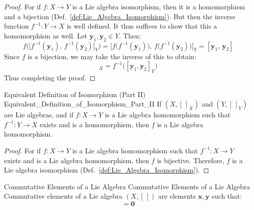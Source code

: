 \documentclass[crop=false,class=article]{standalone}                           %
\begin{document}
        \begin{proof}
            For if $f:X\rightarrow{Y}$ is a Lie algebra isomorphism, then it
            is a homomorphism and a bijection
            (Def.~\ref{def:Lie_Algebra_Isomorphism}). But then the inverse
            function $f^{\minus{1}}:Y\rightarrow{X}$ is well defined. It thus
            suffices to show that this a homomorphism as well. Let
            $\mathbf{y}_{1},\mathbf{y}_{2}\in{Y}$. Then:
            \begin{equation}
                f\Big(\big[f^{\minus{1}}(\mathbf{y}_{1}),\,
                           f^{\minus{1}}(\mathbf{y}_{2})\big]_{Y}\Big)
                =\Big[f\big(f^{\minus{1}}(\mathbf{y}_{1})\big),\,
                      f\big(f^{\minus{1}}(\mathbf{y}_{2})\big)\Big]_{Y}
                =[\mathbf{y}_{1},\,\mathbf{y}_{2}]
            \end{equation}
            Since $f$ is a bijection, we may take the inverse of
            this to obtain:
            \begin{equation}
                [f^{\minus{1}}(\mathbf{y}_{1}),
                 f^{\minus{1}}(\mathbf{y}_{2})]_{X}=
                f^{\minus{1}}\Big([\mathbf{y}_{1},\mathbf{y}_{2}]_{Y}\Big)
            \end{equation}
            Thus completing the proof.
        \end{proof}
        \begin{ltheorem}{Equivalent Definition of Isomorphism (Part II)}
                        {Equivalent_Definition_of_Isomorphism_Part_II}
            If $(X,[\,]_{X})$ and $(Y,[\,]_{Y})$ are Lie algebras, and if
            $f:X\rightarrow{Y}$ is a Lie algebra homomorphism such that
            $f^{\minus{1}}:Y\rightarrow{X}$ exists and is a homomorphism,
            then $f$ is a Lie algebra homomorphism.
        \end{ltheorem}
        \begin{proof}
            For if $f:X\rightarrow{Y}$ is a Lie algebra homomorphism such that
            $f^{\minus{1}}:X\rightarrow{Y}$ exists and is a Lie algebra
            homomorphism, then $f$ is bijective. Therefore, $f$ is a
            Lie algebra isomorphism (Def.~\ref{def:Lie_Algebra_Isomorphism}).
        \end{proof}
        \begin{fdefinition}{Commutative Elements of a Lie Algebra}
                           {Commutative Elements of a Lie Algebra}
            Commutative elements of a Lie algebra $(X,[\,])$ are elements
            $\mathbf{x},\mathbf{y}$ such that:
            \begin{equation}
                [\mathbf{x},\,\mathbf{y}]=\mathbf{0}
            \end{equation}
        \end{fdefinition}
\end{document}
